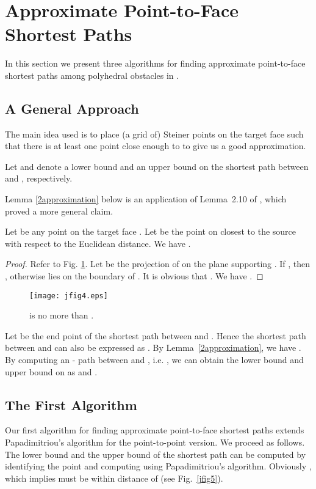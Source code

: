 \documentclass{llncs}
\begin{document}
\section{Approximate Point-to-Face Shortest Paths}
In this section we
present three algorithms for finding approximate point-to-face shortest paths among polyhedral obstacles in .

\subsection{A General Approach}
The main idea used
is to place (a grid of) Steiner points on the target face 
such that there is at least one point close enough to  to give us a good approximation.

Let  and  denote a lower bound and an upper bound on the shortest path between  and ,
respectively.

Lemma \ref{2approximation} below is an application of Lemma~2.10 of \cite{Sar99}, which proved a more
general claim.
\begin{lemma}
\label{2approximation}
Let  be any point on the target face . Let  be the point on  closest to the source 
with respect to the Euclidean distance.
We have .
\end{lemma}

\begin{proof}
Refer to Fig. \ref{jfig4}. Let  be the projection of  on the plane supporting .
If , then , otherwise  lies on the boundary of .
It is obvious that . We have .
\hfill 
\end{proof}

\begin{figure}\begin{center}
    \leavevmode
\texttt{[image: jfig4.eps]}
    \caption{ is no more than .}
    \label{jfig4}
    \end{center}
\end{figure}

Let  be the end point of the shortest path between  and . Hence the shortest path between  and  can also be expressed as . By Lemma~\ref{2approximation}, we have . By computing an - path between  and , i.e. , we can obtain the lower bound and upper bound on  as  and .

\subsection{The First Algorithm}
Our first algorithm for finding approximate point-to-face shortest paths extends Papadimitriou's algorithm for the point-to-point version. We proceed as follows.
The lower bound  and the upper bound  of the shortest path can be computed by identifying the
point  and computing  using Papadimitriou's algorithm.
Obviously , which implies  must be within distance  of  (see Fig.~\ref{jfig5}).
\end{document}
